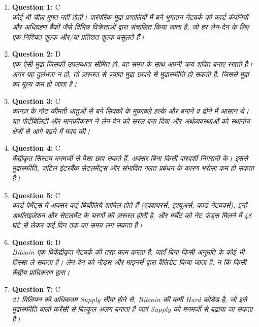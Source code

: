 \documentclass[12pt,a4paper]{article}
\begin{document}
\begin{enumerate}
\item \textbf{Question 1:} C
\\ \textit{कोई भी चीज़ मुफ्त नहीं होती। पारंपरिक मुद्रा प्रणालियों में बने भुगतान नेटवर्क को कार्ड कंपनियों और अधिग्रहण बैंकों जैसे विभिन्न विक्रेताओं द्वारा संचालित किया जाता है, जो हर लेन-देन के लिए एक निश्चित शुल्क और/या प्रतिशत शुल्क वसूलते हैं।}

\item \textbf{Question 2:} D
\\ \textit{एक ऐसी मुद्रा जिसकी उपलब्धता सीमित हो, वह समय के साथ अपनी क्रय शक्ति बनाए रखती है। अगर यह दुर्लभता न हो, तो ज़रूरत से ज़्यादा मुद्रा छापने से मुद्रास्फीति हो सकती है, जिससे मुद्रा का मूल्य कम हो जाता है।}

\item \textbf{Question 3:} C
\\ \textit{कागज़ के नोट कीमती धातुओं से बने सिक्कों के मुकाबले हल्के और बनाने व ढोने में आसान थे। यह पोर्टेबिलिटी और मानकीकरण ने लेन-देन को सरल बना दिया और अर्थव्यवस्थाओं को स्थानीय क्षेत्रों से आगे बढ़ने में मदद की।}

\item \textbf{Question 4:} C
\\ \textit{केंद्रीकृत सिस्टम मनमर्जी से पैसा छाप सकते हैं, अक्सर बिना किसी पारदर्शी निगरानी के। इससे मुद्रास्फीति, जटिल इंटरबैंक सेटलमेंट्स और संभावित गलत प्रबंधन के कारण भरोसा कम हो सकता है।}

\item \textbf{Question 5:} C
\\ \textit{कार्ड पेमेंट्स में अक्सर कई बिचौलिये शामिल होते हैं (एक्वायरर्स, इश्यूअर्स, कार्ड नेटवर्क्स), इन्हें अथॉराइज़ेशन और सेटलमेंट के चरणों की ज़रूरत होती है, और मर्चेंट को नेट फंड्स मिलने में 48 घंटे से लेकर कई दिन तक का समय लग सकता है।}

\item \textbf{Question 6:} D
\\ \textit{Bitcoin एक विकेंद्रीकृत नेटवर्क की तरह काम करता है, जहाँ बिना किसी अनुमति के कोई भी हिस्सा ले सकता है। लेन-देन को नोड्स और माइनर्स द्वारा वैलिडेट किया जाता है, न कि किसी केंद्रीय प्राधिकरण द्वारा।}

\item \textbf{Question 7:} C
\\ \textit{21 मिलियन की अधिकतम Supply सीमा होने से, Bitcoin की कमी Hard कोडेड है, जो इसे मुद्रास्फीति वाली करेंसी से बिल्कुल अलग बनाता है जहां Supply को मनमर्जी से बढ़ाया जा सकता है।}


\end{enumerate}
\end{document}
